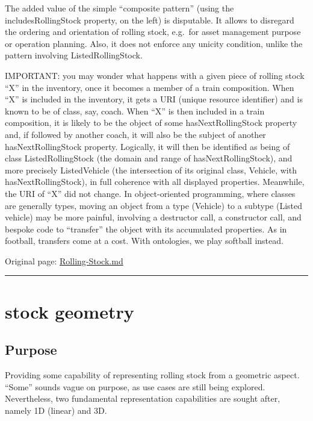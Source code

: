 \documentclass[
  11pt,
]{article}
\begin{document}
The added value of the simple ``composite pattern'' (using the
includesRollingStock property, on the left) is disputable. It allows to
disregard the ordering and orientation of rolling stock, e.g.~for asset
management purpose or operation planning. Also, it does not enforce any
unicity condition, unlike the pattern involving ListedRollingStock.

IMPORTANT: you may wonder what happens with a given piece of rolling
stock ``X'' in the inventory, once it becomes a member of a train
composition. When ``X'' is included in the inventory, it gets a URI
(unique resource identifier) and is known to be of class, say, coach.
When ``X'' is then included in a train composition, it is likely to be
the object of some hasNextRollingStock property and, if followed by
another coach, it will also be the subject of another
hasNextRollingStock property. Logically, it will then be identified as
being of class ListedRollingStock (the domain and range of
hasNextRollingStock), and more precisely ListedVehicle (the intersection
of its original class, Vehicle, with hasNextRollingStock), in full
coherence with all displayed properties. Meanwhile, the URI of ``X'' did
not change. In object-oriented programming, where classes are generally
types, moving an object from a type (Vehicle) to a subtype (Listed
vehicle) may be more painful, involving a destructor call, a constructor
call, and bespoke code to ``transfer'' the object with its accumulated
properties. As in football, transfers come at a cost. With ontologies,
we play softball instead.

Original page:
\href{https://github.com/UICrail/CDM-RSM/wiki/Rolling-Stock}{Rolling-Stock.md}

\begin{center}\rule{0.5\linewidth}{0.5pt}\end{center}

\hypertarget{stock-geometry}{%
\section{stock geometry}\label{stock-geometry}}

\hypertarget{purpose-5}{%
\subsection{Purpose}\label{purpose-5}}

Providing some capability of representing rolling stock from a geometric
aspect. ``Some'' sounds vague on purpose, as use cases are still being
explored. Nevertheless, two fundamental representation capabilities are
sought after, namely 1D (linear) and 3D.
\end{document}
